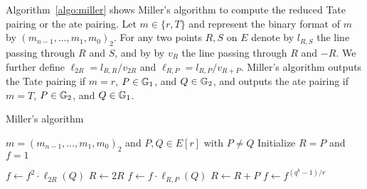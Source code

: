 
Algorithm~\ref{algo:miller} shows Miller's algorithm to compute the reduced Tate pairing or the ate pairing. 
Let $m \in \{r,T\}$ and represent the binary format of $m$ by $(m_{n-1},\dots,m_1,m_0)_2$.
For any two points $R,S$ on $E$ denote by $l_{R,S}$ the line passing through
$R$ and $S$, and by by $v_R$ the line passing through $R$ and $-R$.
We further define $\ell_{2R} = l_{R,R}/v_{2R}$ and
$\ell_{R,P} = l_{R,P} / v_{R+P}$.
Miller's algorithm outputs the Tate pairing if $m = r$, $P \in \mathbb{G}_{1}$, and $Q \in \mathbb{G}_{2}$, and outputs the ate pairing if $m = T$, $P \in \mathbb{G}_{2}$, and $Q \in \mathbb{G}_{1}$.

\begin{algorithm}
\caption{Miller's algorithm}
\label{algo:miller}
\begin{algorithmic}[1]

	\Require $m = (m_{n-1}, \dots, m_1, m_0)_2$ and $P,Q \in E[r]$ with $P \ne Q$
	\State Initialize $R = P$ and $f = 1$

		\State $f \leftarrow f^2 \cdot \ell_{2R}(Q)$
		\State $R \leftarrow 2R$
			\State $f \leftarrow f \cdot \ell_{R,P}(Q)$
			\State $R \leftarrow R+P$
		\EndIf
	\EndFor
	\State $f \leftarrow f^{(q^k-1)/r}$

\end{algorithmic}
\end{algorithm}

